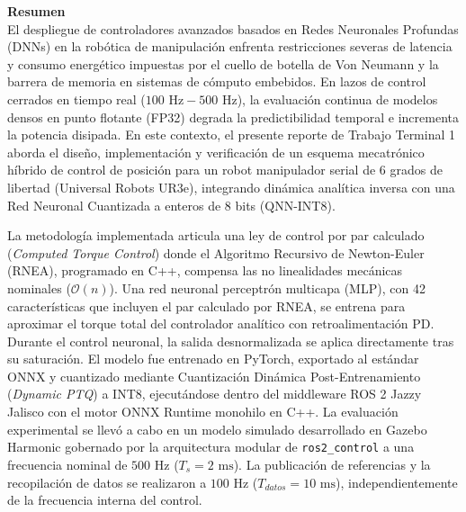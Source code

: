 \documentclass[12pt]{article}
\begin{document}


\setcounter{page}{2}

\newpage
\tableofcontents

\newpage
{}
{\large \textbf{Resumen}}\\
El despliegue de controladores avanzados basados en Redes Neuronales Profundas (DNNs) en la robótica de manipulación enfrenta restricciones severas de latencia y consumo energético impuestas por el cuello de botella de Von Neumann y la barrera de memoria en sistemas de cómputo embebidos. En lazos de control cerrados en tiempo real ($100\text{ Hz} - 500\text{ Hz}$), la evaluación continua de modelos densos en punto flotante (FP32) degrada la predictibilidad temporal e incrementa la potencia disipada. En este contexto, el presente reporte de Trabajo Terminal 1 aborda el diseño, implementación y verificación de un esquema mecatrónico híbrido de control de posición para un robot manipulador serial de 6 grados de libertad (Universal Robots UR3e), integrando dinámica analítica inversa con una Red Neuronal Cuantizada a enteros de 8 bits (QNN-INT8).

La metodología implementada articula una ley de control por par calculado (\textit{Computed Torque Control}) donde el Algoritmo Recursivo de Newton-Euler (RNEA), programado en C++, compensa las no linealidades mecánicas nominales ($\mathcal{O}(n)$). Una red neuronal perceptrón multicapa (MLP), con 42 características que incluyen el par calculado por RNEA, se entrena para aproximar el torque total del controlador analítico con retroalimentación PD. Durante el control neuronal, la salida desnormalizada se aplica directamente tras su saturación. El modelo fue entrenado en PyTorch, exportado al estándar ONNX y cuantizado mediante Cuantización Dinámica Post-Entrenamiento (\textit{Dynamic PTQ}) a INT8, ejecutándose dentro del middleware ROS 2 Jazzy Jalisco con el motor ONNX Runtime monohilo en C++. La evaluación experimental se llevó a cabo en un modelo simulado desarrollado en Gazebo Harmonic gobernado por la arquitectura modular de \texttt{ros2\_control} a una frecuencia nominal de $500\text{ Hz}$ ($T_s = 2\text{ ms}$). La publicación de referencias y la recopilación de datos se realizaron a $100\text{ Hz}$ ($T_{datos}=10\text{ ms}$), independientemente de la frecuencia interna del control.
\end{document}
